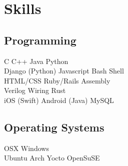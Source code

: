 \documentclass[]{deedy-resume-openfont}
\begin{document}
\begin{minipage}[t]{1.0\textwidth}

\section{Skills}
\subsection{Programming}
C \textbullet{} C++ \textbullet{} Java \textbullet{} Python \\
Django (Python) \textbullet{} Javascript \textbullet{} Bash Shell \\ 
HTML/CSS \textbullet{} Ruby/Rails \textbullet{} Assembly \\
Verilog \textbullet{} Wiring \textbullet{} Rust \\
iOS (Swift) \textbullet{} Android (Java) \textbullet{} MySQL \\
\medskip
\subsection{Operating Systems}
OSX \textbullet{} Windows \\
Ubuntu \textbullet{} Arch \textbullet{} Yocto \textbullet{} OpenSuSE
\sectionsep

%
%

\end{minipage} 
\hfill
\end{document}
